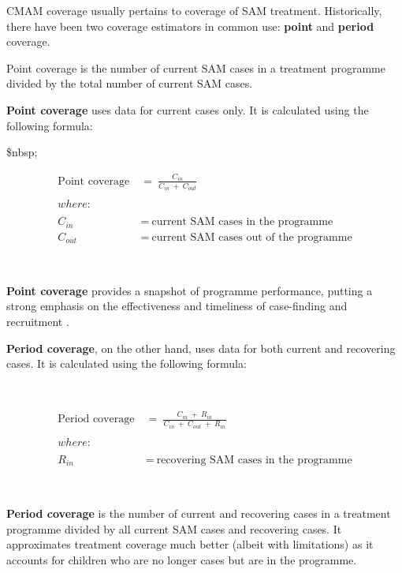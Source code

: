 \documentclass[12pt,a4paper]{article}
\begin{document}
CMAM coverage usually pertains to coverage of SAM treatment. Historically, there have been two coverage estimators in common use: \textbf{point} and \textbf{period} coverage.

Point coverage is the number of current SAM cases in a treatment programme divided by the total number of current SAM cases.

\textbf{Point coverage} uses data for current cases only. It is calculated using the following formula:

\$nbsp;

\[\begin{aligned} 
\text{Point coverage} & ~ = ~ \frac{C_{in}}{C_{in} ~ + ~ C_{out}} \\
\\
where: & \\
\\
C_{in} & ~ = ~ \text{current SAM cases in the programme} \\
C_{out} & ~ = ~ \text{current SAM cases out of the programme}
\end{aligned}\]

~

\textbf{Point coverage} provides a snapshot of programme performance, putting a strong emphasis on the effectiveness and timeliness of case-finding and recruitment \citep{Myatt:2012tt}.

\textbf{Period coverage}, on the other hand, uses data for both current and recovering cases. It is calculated using the following formula:

~

\[\begin{aligned}
\text{Period coverage} & ~ = ~ \frac{C_{in} ~ + ~ R_{in}}{C_{in} ~ + ~ C_{out} ~ + ~ R_{in}} \\
\\
where: & \\
\\
R_{in} & ~ = ~ \text{recovering SAM cases in the programme}
\end{aligned}\]

~

\textbf{Period coverage} is the number of current and recovering cases in a treatment programme divided by all current SAM cases and recovering cases. It approximates treatment coverage much better (albeit with limitations) as it accounts for children who are no longer cases but are in the programme.
\end{document}
